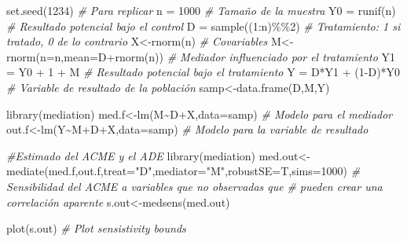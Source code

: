 \documentclass[
]{article}
\newenvironment{Shaded}{\begin{snugshade}}{\end{snugshade}}
\newcommand{\AttributeTok}[1]{\textcolor[rgb]{0.77,0.63,0.00}{#1}}
\newcommand{\CommentTok}[1]{\textcolor[rgb]{0.56,0.35,0.01}{\textit{#1}}}
\newcommand{\DecValTok}[1]{\textcolor[rgb]{0.00,0.00,0.81}{#1}}
\newcommand{\FunctionTok}[1]{\textcolor[rgb]{0.00,0.00,0.00}{#1}}
\newcommand{\NormalTok}[1]{#1}
\newcommand{\OtherTok}[1]{\textcolor[rgb]{0.56,0.35,0.01}{#1}}
\newcommand{\SpecialCharTok}[1]{\textcolor[rgb]{0.00,0.00,0.00}{#1}}
\newcommand{\StringTok}[1]{\textcolor[rgb]{0.31,0.60,0.02}{#1}}
\begin{document}
\begin{Shaded}
\begin{Highlighting}[]
\FunctionTok{set.seed}\NormalTok{(}\DecValTok{1234}\NormalTok{) }\CommentTok{\# Para replicar}
\NormalTok{n }\OtherTok{=} \DecValTok{1000} \CommentTok{\# Tamaño de la muestra}
\NormalTok{Y0 }\OtherTok{=} \FunctionTok{runif}\NormalTok{(n) }\CommentTok{\# Resultado potencial bajo el control}
\NormalTok{D }\OtherTok{=} \FunctionTok{sample}\NormalTok{((}\DecValTok{1}\SpecialCharTok{:}\NormalTok{n)}\SpecialCharTok{\%\%}\DecValTok{2}\NormalTok{) }\CommentTok{\# Tratamiento: 1 si tratado, 0 de lo contrario}
\NormalTok{X}\OtherTok{\textless{}{-}}\FunctionTok{rnorm}\NormalTok{(n) }\CommentTok{\# Covariables}
\NormalTok{M}\OtherTok{\textless{}{-}}\FunctionTok{rnorm}\NormalTok{(}\AttributeTok{n=}\NormalTok{n,}\AttributeTok{mean=}\NormalTok{D}\SpecialCharTok{+}\FunctionTok{rnorm}\NormalTok{(n)) }\CommentTok{\# Mediador influenciado por el tratamiento}
\NormalTok{Y1 }\OtherTok{=}\NormalTok{ Y0 }\SpecialCharTok{+} \DecValTok{1} \SpecialCharTok{+}\NormalTok{ M }\CommentTok{\#  Resultado potencial bajo el tratamiento}
\NormalTok{Y }\OtherTok{=}\NormalTok{ D}\SpecialCharTok{*}\NormalTok{Y1 }\SpecialCharTok{+}\NormalTok{ (}\DecValTok{1}\SpecialCharTok{{-}}\NormalTok{D)}\SpecialCharTok{*}\NormalTok{Y0 }\CommentTok{\#  Variable de resultado de la población }
\NormalTok{samp}\OtherTok{\textless{}{-}}\FunctionTok{data.frame}\NormalTok{(D,M,Y) }

\FunctionTok{library}\NormalTok{(mediation) }
\NormalTok{med.f}\OtherTok{\textless{}{-}}\FunctionTok{lm}\NormalTok{(M}\SpecialCharTok{\textasciitilde{}}\NormalTok{D}\SpecialCharTok{+}\NormalTok{X,}\AttributeTok{data=}\NormalTok{samp) }\CommentTok{\# Modelo para el mediador}
\NormalTok{out.f}\OtherTok{\textless{}{-}}\FunctionTok{lm}\NormalTok{(Y}\SpecialCharTok{\textasciitilde{}}\NormalTok{M}\SpecialCharTok{+}\NormalTok{D}\SpecialCharTok{+}\NormalTok{X,}\AttributeTok{data=}\NormalTok{samp) }\CommentTok{\# Modelo para la variable de resultado}

\CommentTok{\#Estimado del ACME y el  ADE }
\FunctionTok{library}\NormalTok{(mediation) }
\NormalTok{med.out}\OtherTok{\textless{}{-}}
\FunctionTok{mediate}\NormalTok{(med.f,out.f,}\AttributeTok{treat=}\StringTok{"D"}\NormalTok{,}\AttributeTok{mediator=}\StringTok{"M"}\NormalTok{,}\AttributeTok{robustSE=}\NormalTok{T,}\AttributeTok{sims=}\DecValTok{1000}\NormalTok{) }
\CommentTok{\# Sensibilidad del ACME a variables que no observadas que }
\CommentTok{\# pueden crear una correlación aparente}
\NormalTok{s.out}\OtherTok{\textless{}{-}}\FunctionTok{medsens}\NormalTok{(med.out) }

\FunctionTok{plot}\NormalTok{(s.out) }\CommentTok{\# Plot sensistivity bounds }
\end{Highlighting}
\end{Shaded}
\end{document}
